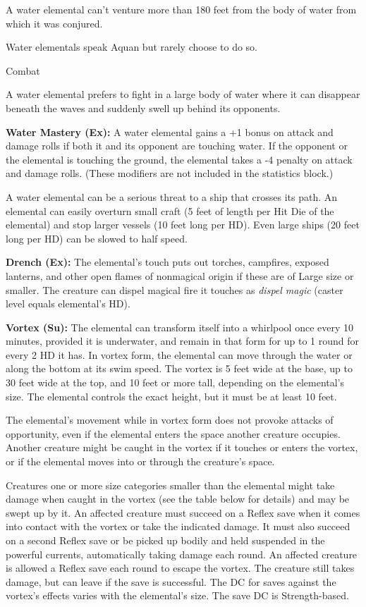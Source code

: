 \documentclass{article}
\begin{document}
\vspace{12pt}
A water elemental can't venture more than 180 feet from the body of water from 
which it was conjured.

Water elementals speak Aquan but rarely choose to do so.

Combat

A water elemental prefers to fight in a large body of water where it can disappear 
beneath the waves and suddenly swell up behind its opponents.

\textbf{Water Mastery (Ex): }A water elemental gains a +1 bonus on attack and damage 
rolls if both it and its opponent are touching water. If the opponent or the elemental 
is touching the ground, the elemental takes a -4 penalty on attack and damage rolls. 
(These modifiers are not included in the statistics block.)

A water elemental can be a serious threat to a ship that crosses its path. An elemental 
can easily overturn small craft (5 feet of length per Hit Die of the elemental) 
and stop larger vessels (10 feet long per HD). Even large ships (20 feet long per 
HD) can be slowed to half speed.

\textbf{Drench (Ex):} The elemental's touch puts out torches, campfires, exposed 
lanterns, and other open flames of nonmagical origin if these are of Large size 
or smaller. The creature can dispel magical fire it touches as \textit{dispel magic 
}(caster level equals elemental's HD).

\textbf{Vortex (Su):} The elemental can transform itself into a whirlpool once 
every 10 minutes, provided it is underwater, and remain in that form for up to 
1 round for every 2 HD it has. In vortex form, the elemental can move through the 
water or along the bottom at its swim speed. The vortex is 5 feet wide at the base, 
up to 30 feet wide at the top, and 10 feet or more tall, depending on the elemental's 
size. The elemental controls the exact height, but it must be at least 10 feet.

The elemental's movement while in vortex form does not provoke attacks of opportunity, 
even if the elemental enters the space another creature occupies. Another creature 
might be caught in the vortex if it touches or enters the vortex, or if the elemental 
moves into or through the creature's space.

Creatures one or more size categories smaller than the elemental might take damage 
when caught in the vortex (see the table below for details) and may be swept up 
by it. An affected creature must succeed on a Reflex save when it comes into contact 
with the vortex or take the indicated damage. It must also succeed on a second 
Reflex save or be picked up bodily and held suspended in the powerful currents, 
automatically taking damage each round. An affected creature is allowed a Reflex 
save each round to escape the vortex. The creature still takes damage, but can 
leave if the save is successful. The DC for saves against the vortex's effects 
varies with the elemental's size. The save DC is Strength-based.
\end{document}
